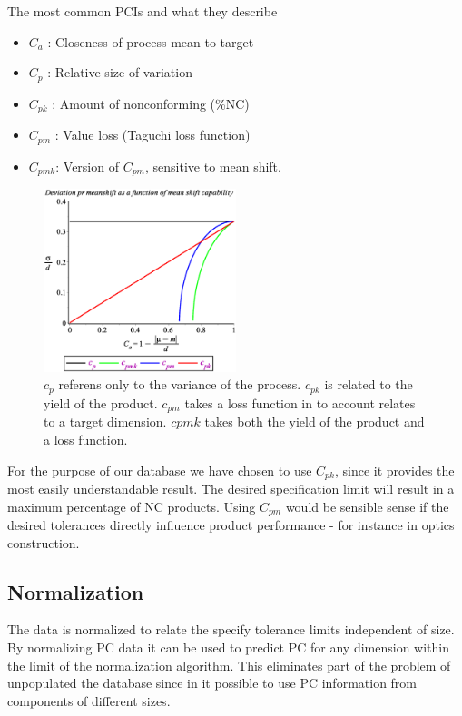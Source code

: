\documentclass[aip,amsmath, reprint, author-year]{revtex4-1}
\begin{document}
The most common PCIs and what they describe \citep{wu2009overview, taguchi1986introduction}
\begin{itemize}
	\item $C_a$ : Closeness of process mean to target 
	\item $C_p$ : Relative size of variation
	\item $C_{pk}$ : Amount of nonconforming (\%NC)
	\item $C_{pm}$ : Value loss (Taguchi loss function)
	\item $C_{pmk}$: Version of $C_{pm}$,  sensitive to mean shift. 
\end{itemize}

\begin{figure}
\includegraphics[width=0.5\textwidth]{graph_postscript_test.eps}
\caption{\label{fig:cpk} $c_p$ referens only to the variance of the process. $c_{pk}$ is related to the yield of the product. $c_{pm}$ takes a loss function in to account relates to a target dimension. $cpmk$ takes both the yield of the product and a loss function. }
\end{figure}

For the purpose of our database we have chosen to use $C_{pk}$, since it provides the most easily understandable result. The desired specification limit will result in a maximum percentage of NC products. Using $C_{pm}$ would be sensible sense if the desired tolerances directly influence product performance - for instance in optics construction.  


\subsection{Normalization}

The data is normalized to relate the specify tolerance limits independent of size. By normalizing PC data it can be used to predict PC for any dimension within the limit of the normalization algorithm. 
This eliminates part of the problem of unpopulated the database since in it possible to use PC information from components of different sizes.
\end{document}
